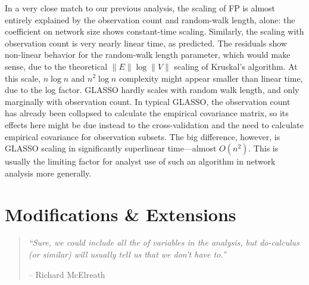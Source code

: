 \documentclass[%
	12pt,
		oneside,
		letterpaper
]{book}
\begin{document}
In a very close match to our previous analysis, the scaling of FP is
almost entirely explained by the observation count and random-walk
length, alone: the coefficient on network size shows constant-time
scaling. Similarly, the scaling with observation count is very nearly
linear time, as predicted. The residuals show non-linear behavior for
the random-walk length parameter, which would make sense, due to the
theoretical \(\|E\|\log\|V\|\) scaling of Kruskal's algorithm. At this
scale, \(n\log n\) and \(n^2\log n\) complexity might appear smaller
than linear time, due to the log factor. GLASSO hardly scales with
random walk length, and only marginally with observation count. In
typical GLASSO, the observation count has already been collapsed to
calculate the empirical covariance matrix, so its effects here might be
due instead to the cross-validation and the need to calculate empirical
covariance for observation subsets. The big difference, however, is
GLASSO scaling in significantly superlinear time---almost \(O(n^2)\).
This is usually the limiting factor for analyst use of such an algorithm
in network analysis more generally.

\chapter{Modifications \& Extensions}\label{sec-extend}

\begin{flushright}

\begin{minipage}{.7\linewidth}

\singlespacing

\begin{quote}
\emph{``Sure, we could include all the of variables in the analysis, but
do-calculus (or similar) will usually tell us that we don't have to.''}

\hfill -- Richard McElreath\\
\doublespacing
\end{quote}

\end{minipage}

\end{flushright}
\end{document}
